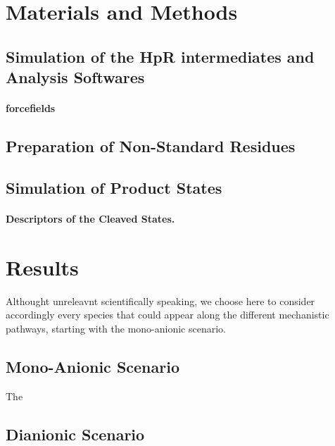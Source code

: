 \documentclass[journal=jacsat,manuscript=article]{achemso}
\begin{document}


% 

% 
\section{Materials and Methods}

\subsection{Simulation of the HpR intermediates and Analysis Softwares}

\paragraph{forcefields}

\subsection{Preparation of Non-Standard Residues}

\subsection{Simulation of Product States}
\paragraph{Descriptors of the Cleaved States.}



\section{Results}

Althought unreleavnt scientifically speaking, we choose here to consider accordingly every species that could appear along the different mechanistic pathways, starting with the mono-anionic scenario. 

\subsection{Mono-Anionic Scenario}
The 


\subsection{Dianionic Scenario}
\end{document}
